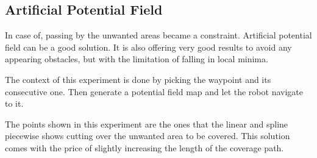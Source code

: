 \subsection{Artificial Potential Field}
In case of, passing by the unwanted areas became a constraint. Artificial potential field can be a good solution. It is also offering very good results to avoid any appearing obstacles, but with the limitation of falling in local minima.

The context of this experiment is done by picking the waypoint and its consecutive one. Then generate a potential field map and let the robot navigate to it.

The points shown in this experiment are the ones that the linear and spline piecewise shows cutting over the unwanted area to be covered. This solution comes with the price of slightly increasing the length of the coverage path.

